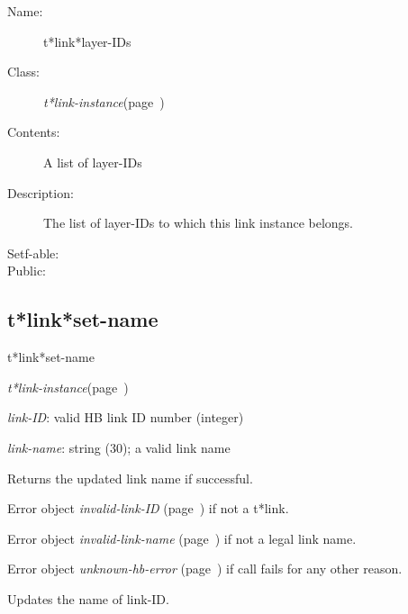 \begin{description}
\item [Name:]  t*link*layer-IDs

\item [Class:] {\sl t*link-instance}\hfill(page~\pageref{t*link-instance})

\item [Contents:] A list of layer-IDs

\item [Description:]

The list of layer-IDs to which this link instance belongs.

\item [Setf-able:]


\item [Public:]



\end{description}
\horizontalline

\subsection{t*link*set-name}
\label{t*link*set-name}

\begin{description}
\item [Name:]  t*link*set-name

\item [Class:] {\sl t*link-instance}\hfill(page~\pageref{t*link-instance})

\item [Parameters:]
\item {\sl link-ID}:  
valid HB link ID number (integer)

\item {\sl link-name}:  string (30); a valid link name


\item [Return-value:]

Returns the updated link name if successful.

Error object {\sl invalid-link-ID} (page~\pageref{invalid-link-ID}) if not a 
t*link. 

Error object {\sl invalid-link-name} (page~\pageref{invalid-link-name}) if not a 
legal link name.

Error object {\sl unknown-hb-error} (page~\pageref{unknown-hb-error}) if call fails
for any other reason.

\item [Description:]

Updates the name of link-ID.

\item [Public:]



\end{description}
\horizontalline

